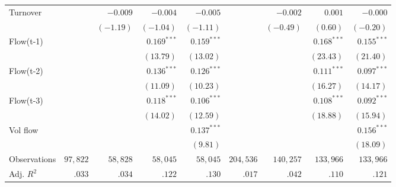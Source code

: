 \documentclass[10pt,a4paper]{article}
\begin{document}
{\begin{longtable}{@{}l*{8}{r}@{}}
Turnover &  & $-0.009$ & $-0.004$ & $-0.005$ &  & $-0.002$ & $0.001$ & $-0.000$\\
 &  & $(-1.19)$ & $(-1.04)$ & $(-1.11)$ &  & $(-0.49)$ & $(0.60)$ & $(-0.20)$\\
Flow(t-1) &  &  & $0.169^{***}$ & $0.159^{***}$ &  &  & $0.168^{***}$ & $0.155^{***}$\\
 &  &  & $(13.79)$ & $(13.02)$ &  &  & $(23.43)$ & $(21.40)$\\
Flow(t-2) &  &  & $0.136^{***}$ & $0.126^{***}$ &  &  & $0.111^{***}$ & $0.097^{***}$\\
 &  &  & $(11.09)$ & $(10.23)$ &  &  & $(16.27)$ & $(14.17)$\\
Flow(t-3) &  &  & $0.118^{***}$ & $0.106^{***}$ &  &  & $0.108^{***}$ & $0.092^{***}$\\
 &  &  & $(14.02)$ & $(12.59)$ &  &  & $(18.88)$ & $(15.94)$\\
Vol flow &  &  &  & $0.137^{***}$ &  &  &  & $0.156^{***}$\\
 &  &  &  & $(9.81)$ &  &  &  & $(18.09)$\\
Observations & $97{,}822$ & $58{,}828$ & $58{,}045$ & $58{,}045$ & $204{,}536$ & $140{,}257$ & $133{,}966$ & $133{,}966$\\
Adj. $R^2$ & $.033$ & $.034$ & $.122$ & $.130$ & $.017$ & $.042$ & $.110$ & $.121$\\
\bottomrule
\end{longtable}}
\end{document}
